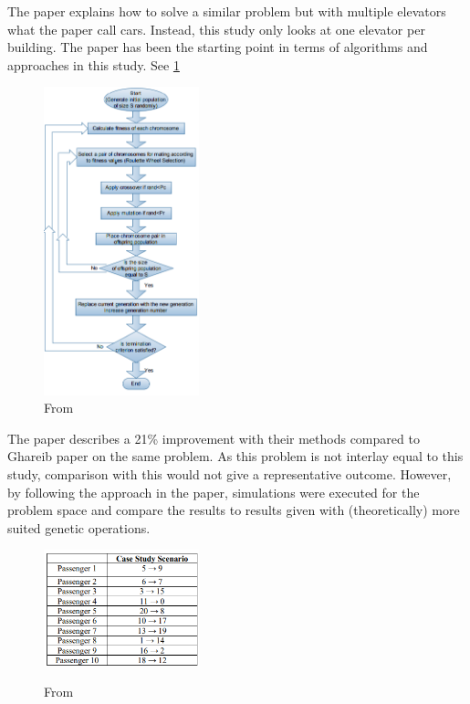 
The paper\cite{tartan2016genetic} explains how to solve a similar problem but with multiple elevators what the paper call cars. Instead, this study only looks at one elevator per building. The paper has been the starting point in terms of algorithms and approaches in this study. See \ref{fig:Flow_1}

\begin{figure}[ht]
	\centering
	\includegraphics[width=0.4\textwidth]{diagram_1.png}
	\caption{From \cite{tartan2016flow}}
	\label{fig:Flow_1}
\end{figure}
The paper describes a 21\% improvement with their methods compared to Ghareib paper \cite{gharieb2005optimal} on the same problem. As this problem is not interlay equal to this study, comparison with this would not give a representative outcome. However, by following the approach in the paper, simulations were executed for the problem space and compare the results to results given with (theoretically) more suited genetic operations.

\newpage

\begin{figure}[ht]
	\centering
	\includegraphics[width=0.4\textwidth]{tabel_1.png}
	\label{fig:Tabel_1}
	\caption{From \cite{ahmed2022investigation}}
\end{figure}

